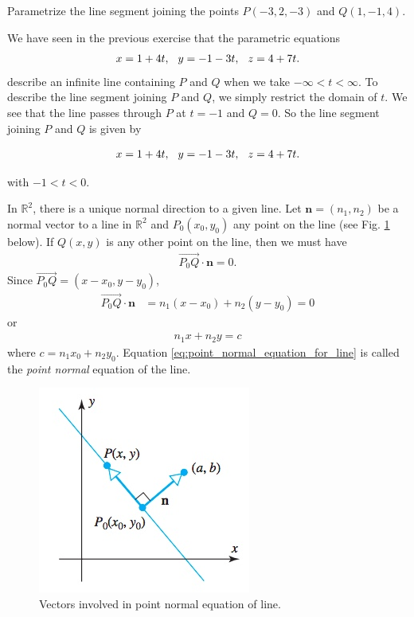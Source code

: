 \documentclass[12pt,letterpaper,reqno]{article}
\numberwithin{equation}{section}
\begin{document}
\begin{example}
Parametrize the line segment joining the points $P(-3,2,-3)$ and $Q(1,-1,4)$.	
\end{example}
{\color{red} 
We have seen in the previous exercise that the  parametric equations 
\begin{align*}
	x=1+4t, \hspace{0.25cm} y=-1-3t, \hspace{0.25cm} z=4+7t.
\end{align*}
describe an infinite line containing $P$ and $Q$ when we take $-\infty < t < \infty$. To describe the line segment joining $P$ and $Q$, we simply restrict the domain of $t$. We see that the line passes through $P$ at $t=-1$ and $Q=0$. So the line segment joining $P$ and $Q$ is given by 

\begin{align*}
	x=1+4t, \hspace{0.25cm} y=-1-3t, \hspace{0.25cm} z=4+7t.
\end{align*}

with $-1 < t < 0$.}

In $\mathbb{R}^2$, there is a unique normal direction to a given line. Let $\mathbf{n}=(n_1,n_2)$ be a normal vector to a line in $\mathbb{R}^2$ and $P_0(x_0,y_0)$ any point on the line (see Fig. \ref{fig:point_normal_eq_for_line} below). If $Q(x,y)$ is any other point on the line, then we must have
\begin{align*}
	\overrightarrow{P_0Q}\cdot \mathbf{n}=0.
\end{align*}
Since $\overrightarrow{P_0Q}=(x-x_0,y-y_0)$, 
\begin{align*}
	\overrightarrow{P_0Q}\cdot \mathbf{n}&=n_1(x-x_0)+n_2(y-y_0)=0
\end{align*}
or
\begin{align}\label{eq:point_normal_equation_for_line}
	n_1x+n_2y=c
\end{align}
where $c=n_1x_0+n_2y_0$. Equation \eqref{eq:point_normal_equation_for_line} is called the \emph{point normal} equation of the line.

\begin{figure}[h]\label{fig:point_normal_eq_for_line}
	\begin{center}
		\includegraphics[scale=0.5]{figures_mvc/point_normal_eq_for_line}
	\end{center}
	\caption{Vectors involved in point normal equation of line.}
\end{figure}
\end{document}
